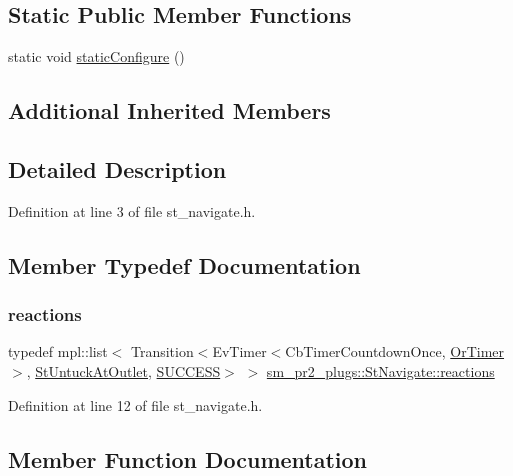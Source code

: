 \subsection*{Static Public Member Functions}
\begin{DoxyCompactItemize}
\item 
static void \hyperlink{structsm__pr2__plugs_1_1StNavigate_a052e5c763e3e8d487f3dcaa2a9a2fab0}{static\+Configure} ()
\end{DoxyCompactItemize}
\subsection*{Additional Inherited Members}


\subsection{Detailed Description}


Definition at line 3 of file st\+\_\+navigate.\+h.



\subsection{Member Typedef Documentation}
\mbox{\label{structsm__pr2__plugs_1_1StNavigate_a11299afba109067d019e8526f10f2286}} 
\subsubsection{\texorpdfstring{reactions}{reactions}}
{\footnotesize\ttfamily typedef mpl\+::list$<$ Transition$<$Ev\+Timer$<$Cb\+Timer\+Countdown\+Once, \hyperlink{classsm__pr2__plugs_1_1OrTimer}{Or\+Timer}$>$, \hyperlink{structsm__pr2__plugs_1_1StUntuckAtOutlet}{St\+Untuck\+At\+Outlet}, \hyperlink{classSUCCESS}{S\+U\+C\+C\+E\+SS}$>$ $>$ \hyperlink{structsm__pr2__plugs_1_1StNavigate_a11299afba109067d019e8526f10f2286}{sm\+\_\+pr2\+\_\+plugs\+::\+St\+Navigate\+::reactions}}



Definition at line 12 of file st\+\_\+navigate.\+h.



\subsection{Member Function Documentation}
\mbox{\label{structsm__pr2__plugs_1_1StNavigate_a4b93030d30eeb790de5b8e762f4d2b59}} 
